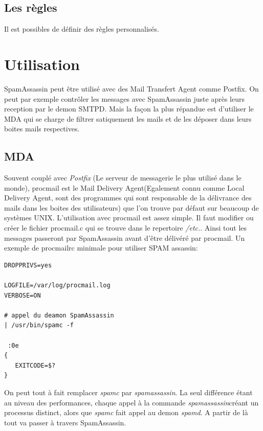 \documentclass[a4paper,11pt]{article}
\begin{document}
\subsection{Les règles}

Il est possibles de définir des règles personnalisés. 

\section{ Utilisation }


SpamAssassin peut être utilisé avec des Mail Transfert Agent comme Postfix. On peut par exemple contrôler les messages
avec SpamAssassin juste après leurs reception par le demon SMTPD. Mais la façon la plus répandue est d'utiliser le MDA qui se charge
de filtrer satiquement les mails et de les déposer dans leurs boites mails respectives. 

\subsection{MDA}

Souvent couplé avec \emph{Postfix} (Le serveur de messagerie le plus utilisé dans le monde), procmail est le 
Mail Delivery Agent(Egalement connu comme Local Delivery Agent, sont des programmes qui sont responsable
de la délivrance des mails dans les boites des utilisateurs) que l'on trouve par défaut sur beaucoup de systèmes UNIX.
L'utilisation avec procmail est assez simple. Il faut modifier ou créer le fichier procmail.c qui se trouve dans le repertoire \emph{/etc.}.
Ainsi tout les messages passeront par SpamAssassin avant d'être délivéré par procmail. 
\linebreak
Un exemple de procmailrc minimale pour utiliser SPAM assassin:
\begin{lstlisting}[frame=single]  
DROPPRIVS=yes

LOGFILE=/var/log/procmail.log
VERBOSE=ON

# appel du deamon SpamAssassin
| /usr/bin/spamc -f

 :0e
{
   EXITCODE=$?
}
\end{lstlisting}
On peut tout à fait remplacer \emph{spamc} par \emph{spamassassin}. La seul différence étant au niveau des performances, 
chaque appel à la commande \emph{spamassassin}créant un processus distinct, alors que \emph{spamc} fait appel au demon \emph{spamd}.
A partir de là tout va passer à travers SpamAssassin.

\pagebreak
\end{document}
